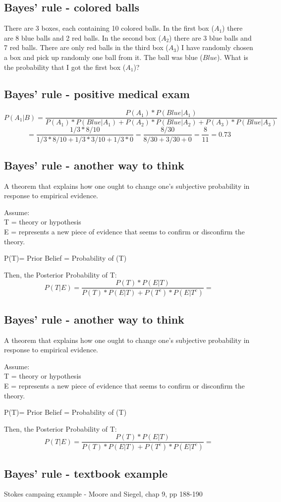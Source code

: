 \documentclass[11pt]{article}
\begin{document}
	\subsection*{Bayes' rule - colored balls}
	There are 3 boxes, each containing 10 colored balls. In the first box ($A_1$) there are 8 blue balls and 2 red balls. In the second box ($A_2$) there are 3 blue balls and 7 red balls. There are only red balls in the third box ($A_3$) I have randomly chosen a box and pick up randomly one ball from it. The ball was blue ($Blue$). What is the probability that I got the first box ($A_1$)?


	\subsection*{Bayes' rule - positive medical exam}

	
	\small{\[P(A_1|B) = \frac{P(A_1)*P(Blue|A_1)}{P(A_1)*P(Blue|A_1)+P(A_2)*P(Blue|A_2)+P(A_3)*P(Blue|A_3)}\]}
	\[= \frac{1/3*8/10}{1/3*8/10+1/3*3/10+1/3*0} = \frac{8/30}{8/30+3/30+0} = \frac{8}{11} = 0.73\] 
	

	\subsection*{Bayes' rule - another way to think}
	A theorem that explains how one ought to change one’s subjective probability in response to empirical evidence. 
	
	Assume: \\
	T = theory or hypothesis \\
	E = represents a new piece of evidence that seems to confirm or 
	disconfirm the theory. 
	
	P(T)=  Prior Belief = Probability of (T) 
	
	Then, the Posterior Probability of T:
	\[P(T|E) = \frac{P(T)*P(E|T)}{P(T)*P(E|T)+P(T^c)*P(E|T^c)}=\]


	\subsection*{Bayes' rule - another way to think}
	A theorem that explains how one ought to change one’s subjective probability in response to empirical evidence. 
	
	Assume: \\
	T = theory or hypothesis \\
	E = represents a new piece of evidence that seems to confirm or 
	disconfirm the theory. 
	
	P(T)=  Prior Belief = Probability of (T) 
	
	Then, the Posterior Probability of T:
	\[P(T|E) = \frac{P(T)*P(E|T)}{P(T)*P(E|T)+P(T^c)*P(E|T^c)}=\]



	\subsection*{Bayes' rule - textbook example}
	Stokes campaing example - Moore and Siegel, chap 9, pp 188-190
	
\end{document}
